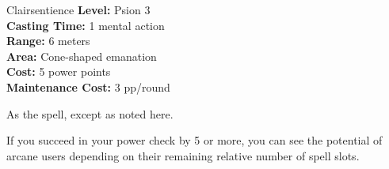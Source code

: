 {Clairsentience}
{
	\textbf{Level:}
	Psion 3\\
	\textbf{Casting Time:}
	1 mental action\\
	\textbf{Range:}
	6 meters\\
	\textbf{Area:}
	Cone-shaped emanation\\
	\textbf{Cost:}
	5 power points\\
	\textbf{Maintenance Cost:}
	3 pp/round\\
}
{
	As the  spell, except as noted here.

	If you succeed in your power check by 5 or more, you can see the potential of arcane users depending on their remaining relative number of spell slots.

}